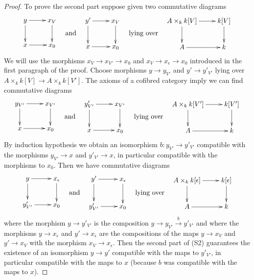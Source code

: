 \begin{proof}
\medskip\noindent
To prove the second part suppose given two commutative
diagrams
$$
\vcenter{
\xymatrix{
y \ar[r] \ar[d] & x_V \ar[d] \\
x \ar[r] & x_0
}
}
\quad\text{and}\quad
\vcenter{
\xymatrix{
y' \ar[r] \ar[d] & x_V \ar[d] \\
x \ar[r] & x_0
}
}
\quad\text{lying over}\quad
\vcenter{
\xymatrix{
A \times_k k[V] \ar[d] \ar[r] & k[V] \ar[d] \\
A \ar[r] & k
}
}
$$
We will use the morphisms $x_V \to x_{V'} \to x_0$ and
$x_V \to x_\epsilon \to x_0$ introduced in the first paragraph of the proof.
Choose morphisms $y \to y_{V'}$ and $y' \to y'_{V'}$
lying over $A \times_k k[V] \to A \times_k k[V']$. The axioms of a
cofibred category imply we can find commutative diagrams
$$
\vcenter{
\xymatrix{
y_{V'} \ar[r] \ar[d] & x_{V'} \ar[d] \\
x \ar[r] & x_0
}
}
\quad\text{and}\quad
\vcenter{
\xymatrix{
y'_{V'} \ar[r] \ar[d] & x_{V'} \ar[d] \\
x \ar[r] & x_0
}
}
\quad\text{lying over}\quad
\vcenter{
\xymatrix{
A \times_k k[V'] \ar[d] \ar[r] & k[V'] \ar[d] \\
A \ar[r] & k
}
}
$$
By induction hypothesis we obtain an isomorphism
$b : y_{V'} \to y'_{V'}$
compatible with the morphisms $y_{V'} \to x$ and $y'_{V'} \to x$,
in particular compatible with the morphisms to $x_0$.
Then we have commutative diagrams
$$
\vcenter{
\xymatrix{
y \ar[r] \ar[d] & x_\epsilon \ar[d] \\
y'_{V'} \ar[r] & x_0
}
}
\quad\text{and}\quad
\vcenter{
\xymatrix{
y' \ar[r] \ar[d] & x_\epsilon \ar[d] \\
y'_{V'} \ar[r] & x_0
}
}
\quad\text{lying over}\quad
\vcenter{
\xymatrix{
A \times_k k[\epsilon] \ar[d] \ar[r] & k[\epsilon] \ar[d] \\
A \ar[r] & k
}
}
$$
where the morphism $y \to y'_{V'}$ is the composition
$y \to y_{V'} \xrightarrow{b} y'_{V'}$ and where the morphisms
$y \to x_\epsilon$ and $y' \to x_\epsilon$ are the compositions of
the maps $y \to x_V$ and $y' \to x_V$ with the morphism $x_V \to x_\epsilon$.
Then the second part of (S2) guarantees the existence of an isomorphism
$y \to y'$ compatible with the maps to $y'_{V'}$, in particular compatible
with the maps to $x$ (because $b$ was compatible with the maps to $x$).
\end{proof}

